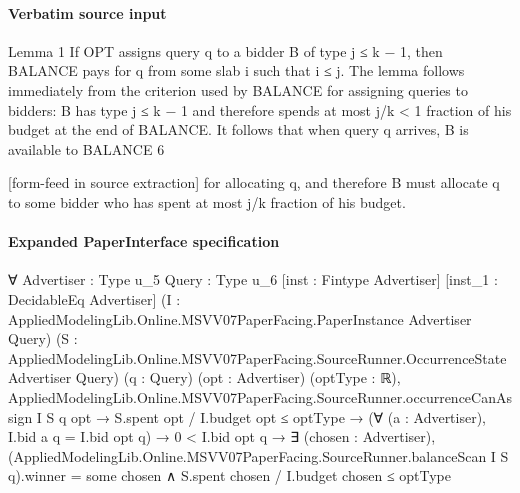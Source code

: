 \documentclass[10pt]{article}
\begin{document}
\paragraph{Verbatim source input}
\begin{ReviewVerbatim}
Lemma 1 If OPT assigns query q to a bidder B of type j ≤ k − 1, then BALANCE pays for
q from some slab i such that i ≤ j.
The lemma follows immediately from the criterion used by BALANCE for assigning queries
to bidders: B has type j ≤ k − 1 and therefore spends at most j/k < 1 fraction of his budget
at the end of BALANCE. It follows that when query q arrives, B is available to BALANCE
6


[form-feed in source extraction]
for allocating q, and therefore B must allocate q to some bidder who has spent at most j/k
fraction of his budget.
\end{ReviewVerbatim}



\paragraph{Expanded PaperInterface specification}
\begin{ReviewVerbatim}
∀ {Advertiser : Type u_5} {Query : Type u_6} [inst : Fintype Advertiser] [inst_1 : DecidableEq Advertiser]
  (I : AppliedModelingLib.Online.MSVV07PaperFacing.PaperInstance Advertiser Query)
  (S : AppliedModelingLib.Online.MSVV07PaperFacing.SourceRunner.OccurrenceState Advertiser Query) (q : Query)
  (opt : Advertiser) (optType : ℝ),
  AppliedModelingLib.Online.MSVV07PaperFacing.SourceRunner.occurrenceCanAssign I S q opt →
    S.spent opt / I.budget opt ≤ optType →
      (∀ (a : Advertiser), I.bid a q = I.bid opt q) →
        0 < I.bid opt q →
          ∃ (chosen : Advertiser),
            (AppliedModelingLib.Online.MSVV07PaperFacing.SourceRunner.balanceScan I S q).winner = some chosen ∧
              S.spent chosen / I.budget chosen ≤ optType
\end{ReviewVerbatim}
\end{document}

